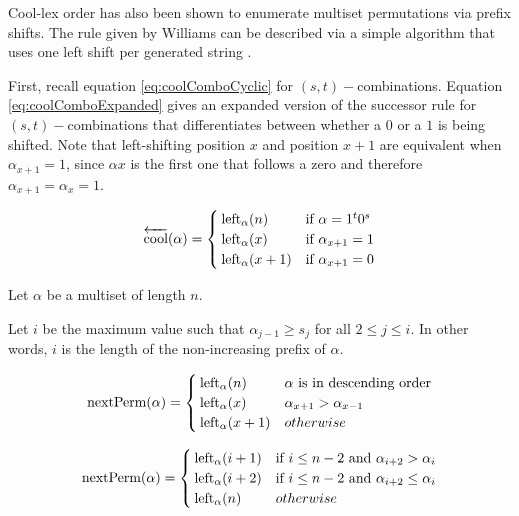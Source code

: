 Cool-lex order has also been shown to enumerate multiset permutations via prefix shifts.  The rule given by Williams can be described via a simple algorithm that uses one left shift per generated string  \cite{williams2009loopless}.

First, recall equation \ref{eq:coolComboCyclic} for $(s,t)-$combinations.  Equation \ref{eq:coolComboExpanded} gives an expanded version of the successor rule for $(s,t)-$combinations that differentiates between whether a $0$ or a $1$ is being shifted. Note that left-shifting position $x$ and position $x+1$ are equivalent when $\alpha_{x+1}=1$, since $\alpha{x}$ is the first one that follows a zero and therefore $\alpha_{x+1}=\alpha_{x}=1$.

\begin{equation} \label{eq:coolComboExpanded}
    \overleftarrow{\text{cool}}(\alpha) = \begin{cases}
	\leftshift[\alpha]{n} & \text{if $\alpha=1^t0^s$}\\
	\leftshift[\alpha]{x} & \text{if $\alpha_{x+1}=1$}\\
	\leftshift[\alpha]{x+1} & \text{if $\alpha_{x+1}=0$}\\
\end{cases}
\end{equation}


 Let $\alpha$ be a multiset of length $n$.

 Let $i$ be the maximum value such that $\alpha_{j-1} \ge s_j$ for all $2 \le j \le i$.  In other words, $i$ is the length of the non-increasing prefix of $\alpha$.  

\begin{equation}\label{eq:coolPerms}
    \text{nextPerm}(\alpha) = \begin{cases}
	\leftshift[\alpha]{n} & \text{$\alpha$ is in descending order}\\
	\leftshift[\alpha]{x} & \alpha_{x+1} > \alpha_{x-1}\\
	\leftshift[\alpha]{x+1} & otherwise\\
\end{cases}
\end{equation}

\begin{equation*}
    \text{nextPerm}(\alpha) = \begin{cases}
	\leftshift[\alpha]{i+1} & \text{if $i \le n-2$ and $\alpha_{i+2} > \alpha_i$}\\
	\leftshift[\alpha]{i+2} & \text{if $i \le n-2$ and $\alpha_{i+2} \le \alpha_i$}\\
	\leftshift[\alpha]{n} & otherwise\\
\end{cases}
\end{equation*}



